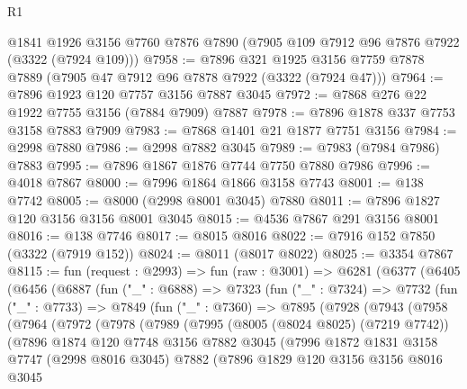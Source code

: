 \begin{lexlean}{R1}
\begin{coremodule}
    @1841
    @1926
    @3156
    @7760
    @7876
    @7890
    (@7905 @109 @7912 @96 @7876 @7922 (@3322 (@7924 @109)))
@7958 := @7896
    @321
    @1925
    @3156
    @7759
    @7878
    @7889
    (@7905 @47 @7912 @96 @7878 @7922 (@3322 (@7924 @47)))
@7964 := @7896 @1923 @120 @7757 @3156 @7887 @3045
@7972 := @7868 @276 @22 @1922 @7755 @3156 (@7884 @7909) @7887
@7978 := @7896 @1878 @337 @7753 @3158 @7883 @7909
@7983 := @7868 @1401 @21 @1877 @7751 @3156
@7984 := @2998 @7880
@7986 := @2998 @7882 @3045
@7989 := @7983 (@7984 @7986) @7883
@7995 := @7896 @1867 @1876 @7744 @7750 @7880 @7986
@7996 := @4018 @7867
@8000 := @7996 @1864 @1866 @3158 @7743
@8001 := @138 @7742
@8005 := @8000 (@2998 @8001 @3045) @7880
@8011 := @7896 @1827 @120 @3156 @3156 @8001 @3045
@8015 := @4536 @7867 @291 @3156 @8001
@8016 := @138 @7746
@8017 := @8015 @8016
@8022 := @7916 @152 @7850 (@3322 (@7919 @152))
@8024 := @8011 (@8017 @8022)
@8025 := @3354 @7867
@8115 := fun (request : @2993) =>
  fun (raw : @3001) =>
  @6281
    (@6377
      (@6405
        (@6456
          (@6887
            (fun ("_" : @6888) =>
            @7323
              (fun ("_" : @7324) =>
              @7732
                (fun ("_" : @7733) =>
                @7849
                  (fun ("_" : @7360) =>
                  @7895
                    (@7928
                      (@7943
                        (@7958
                          (@7964
                            (@7972
                              (@7978
                                (@7989
                                  (@7995
                                    (@8005 (@8024 @8025) (@7219 @7742))
                                    (@7896
                                      @1874
                                      @120
                                      @7748
                                      @3156
                                      @7882
                                      @3045
                                      (@7996
                                        @1872
                                        @1831
                                        @3158
                                        @7747
                                        (@2998 @8016 @3045)
                                        @7882
                                        (@7896
                                          @1829
                                          @120
                                          @3156
                                          @3156
                                          @8016
                                          @3045

\end{coremodule}
\end{lexlean}
